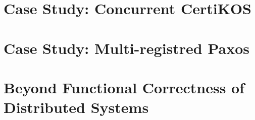\documentclass[letterpaper,11pt]{yalephd}
\begin{document}







\chapter{Case Study: Concurrent CertiKOS}
\label{chapter:concurrent-certikos}


%
%
%
%
%
%
%
%


\chapter{Case Study: Multi-registred Paxos}
\label{chapter:wormspace}

%
%








\chapter{Beyond Functional Correctness of Distributed Systems}
\label{chapter:witness-passing}

%

%








%
%
\end{document}
